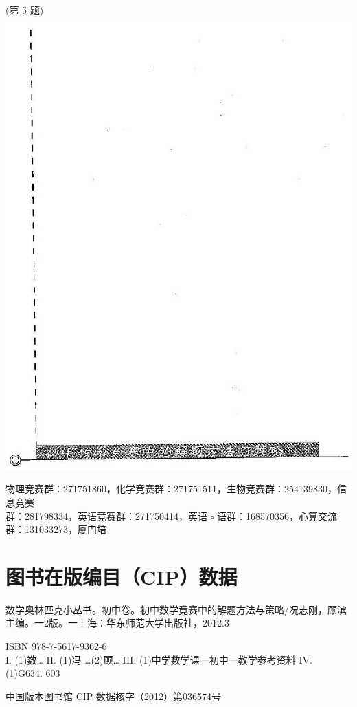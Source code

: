 \documentclass[10pt]{article}
\begin{document}
(第 5 题)\\
\includegraphics[max width=\textwidth, center]{2024_10_30_21385cc68d0979b6f3f8g-180(1)}

物理竞赛群：271751860，化学竞赛群：271751511，生物竞赛群：254139830，信息竞赛\\
群：281798334，英语竞赛群：271750414，英语 $\square$ 语群：168570356，心算交流群：131033273，厦门培

\section{图书在版编目（CIP）数据}
数学奥林匹克小丛书。初中卷。初中数学竟赛中的解题方法与策略/况志刚，顾滨主编。一2版。一上海：华东师范大学出版社，2012.3

ISBN 978-7-5617-9362-6\\
I. (1)数… II. (1)冯 …(2)顾… III. (1)中学数学课一初中一教学参考资料 IV. (1)G634. 603

中国版本图书馆 CIP 数据核字（2012）第036574号
\end{document}
